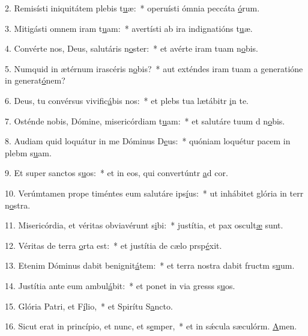 2. Remisísti iniquitátem plebis t\uline{u}æ:~* operuísti ómnia peccáta \uline{ó}rum.\par 
3. Mitigásti omnem iram t\uline{u}am:~* avertísti ab ira indignatións t\uline{u}æ.\par 
4. Convérte nos, Deus, salutáris n\uline{o}ster:~* et avérte iram tuam  n\uline{o}bis.\par 
5. Numquid in ætérnum irascéris n\uline{o}bis?~* aut exténdes iram tuam a generatióne in generat\uline{ó}nem?\par 
6. Deus, tu convérsus vivific\uline{á}bis nos:~* et plebs tua lætábitr \uline{i}n te.\par 
7. Osténde nobis, Dómine, misericórdiam t\uline{u}am:~* et salutáre tuum d n\uline{o}bis.\par 
8. Audiam quid loquátur in me Dóminus D\uline{e}us:~* quóniam loquétur pacem in plebm s\uline{u}am.\par 
9. Et super sanctos s\uline{u}os:~* et in eos, qui convertúntr \uline{a}d cor.\par 
10. Verúmtamen prope timéntes eum salutáre ips\uline{í}us:~* ut inhábitet glória in terr n\uline{o}stra.\par 
11. Misericórdia, et véritas obviavérunt s\uline{i}bi:~* justítia, et pax oscult\uline{æ} sunt.\par 
12. Véritas de terra \uline{o}rta est:~* et justítia de cælo prsp\uline{é}xit.\par 
13. Etenim Dóminus dabit benignit\uline{á}tem:~* et terra nostra dabit fructm s\uline{u}um.\par 
14. Justítia ante eum ambul\uline{á}bit:~* et ponet in via gresss s\uline{u}os.\par 
15. Glória Patri, et F\uline{í}lio,~* et Spirítu S\uline{a}ncto.\par 
16. Sicut erat in princípio, et nunc, et s\uline{e}mper,~* et in sǽcula sæculórm. \uline{A}men.\par 
